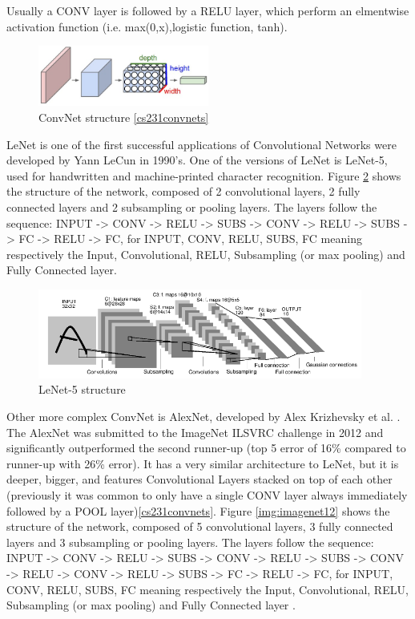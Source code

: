 \documentclass[]{article}
\begin{document}
Usually a CONV layer is followed by a RELU layer, which perform an elmentwise activation function (i.e. max(0,x),logistic function, tanh).

\begin{figure}[htpb!]
\centering
\includegraphics[width= 0.5\textwidth]{images/cnn}
\caption{ConvNet structure \ref{cs231convnets}\label{img:cnn}}
\end{figure}



LeNet is one of the first successful applications of Convolutional Networks were developed by Yann LeCun in 1990’s. One of the versions of LeNet is LeNet-5, used for handwritten and machine-printed character recognition. Figure \ref{img:lenet5} shows the structure of the network, composed of 2 convolutional layers, 2 fully connected layers and 2 subsampling or pooling layers. The layers follow the sequence: INPUT -> CONV -> RELU -> SUBS -> CONV -> RELU -> SUBS -> FC -> RELU -> FC, for INPUT, CONV, RELU, SUBS, FC meaning respectively the Input, Convolutional, RELU, Subsampling (or max pooling) and Fully Connected layer.
\begin{figure}[htpb!]
\centering
\includegraphics[width= 0.95\textwidth]{images/lenet5}
\caption{LeNet-5 structure \cite{Lecun98} \label{img:lenet5}}
\end{figure}

Other more complex ConvNet is AlexNet, developed by Alex Krizhevsky et al. \cite{Krizhevsky12}. The AlexNet was submitted to the ImageNet ILSVRC challenge in 2012 and significantly outperformed the second runner-up (top 5 error of 16\% compared to runner-up with 26\% error). It has a very similar architecture to LeNet, but it is  deeper, bigger, and features Convolutional Layers stacked on top of each other (previously it was common to only have a single CONV layer always immediately followed by a POOL layer)\ref{cs231convnets}. Figure \ref{img:imagenet12} shows the structure of the network, composed of 5 convolutional layers, 3 fully connected layers and 3 subsampling or pooling layers. The layers follow the sequence: INPUT -> CONV -> RELU -> SUBS -> CONV -> RELU -> SUBS -> CONV -> RELU -> CONV -> RELU -> SUBS -> FC -> RELU -> FC, for INPUT, CONV, RELU, SUBS, FC meaning respectively the Input, Convolutional, RELU, Subsampling (or max pooling) and Fully Connected layer .%
\end{document}
